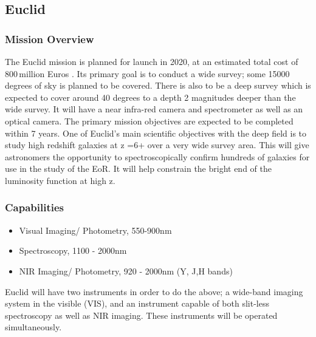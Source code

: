 
\subsection{Euclid} %
	\label{sub:euclid}

	\subsubsection{Mission Overview} %
		\label{ssub:mission_overview}
		The Euclid mission is planned for launch in 2020, at an estimated total cost of 800\,million Euros \cite{bbc_euclid}. Its primary goal is to conduct a wide survey; some 15000 degrees of sky is planned to be covered. There is also to be a deep survey which is expected to cover around 40 degrees to a depth 2 magnitudes deeper than the wide survey. It will have a near infra-red camera and spectrometer as well as an optical camera. The primary mission  objectives are expected to be completed within 7 years. One of Euclid’s main scientific objectives with the deep field is to study high redshift galaxies at z =6+ over a very wide survey area. This will give astronomers the opportunity to spectroscopically confirm hundreds of galaxies for use in the study of the EoR. It will help constrain the bright end of the luminosity function at high z.

	\subsubsection{Capabilities} %
		\label{ssub:capabilities}
		\begin{itemize}
			\item Visual Imaging/ Photometry, 550-900\si{\nano\metre}
			\item Spectroscopy, 1100 - 2000\si{\nano\metre}
			\item NIR Imaging/ Photometry, 920 - 2000\si{\nano\metre} (Y, J,H bands)
		\end{itemize}

		Euclid will have two instruments in order to do the above; a wide-band imaging system in the visible (VIS), and an instrument capable of both slit-less spectroscopy as well as NIR imaging. These instruments will be operated simultaneously.

